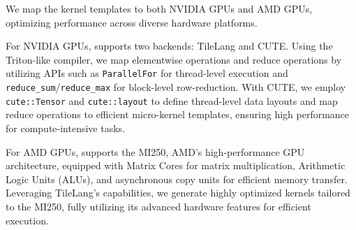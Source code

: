 






We map the kernel templates to both NVIDIA GPUs and AMD GPUs, optimizing performance across diverse hardware platforms.

For NVIDIA GPUs, \oursys{} supports two backends: TileLang\cite{tilelang} and CUTE\cite{nvidia2024cutlass}. Using the Triton-like compiler, we map elementwise operations and reduce operations by utilizing APIs such as \texttt{ParallelFor} for thread-level execution and \texttt{reduce\_sum}/\texttt{reduce\_max} for block-level row-reduction. With CUTE, we employ \texttt{cute::Tensor} and \texttt{cute::layout} to define thread-level data layouts and map reduce operations to efficient micro-kernel templates, ensuring high performance for compute-intensive tasks.

For AMD GPUs, \oursys{} supports the MI250, AMD’s high-performance GPU architecture, equipped with Matrix Cores for matrix multiplication, Arithmetic Logic Units (ALUs), and asynchronous copy units for efficient memory transfer. Leveraging TileLang\cite{tilelang}’s capabilities, we generate highly optimized kernels tailored to the MI250, fully utilizing its advanced hardware features for efficient execution.

